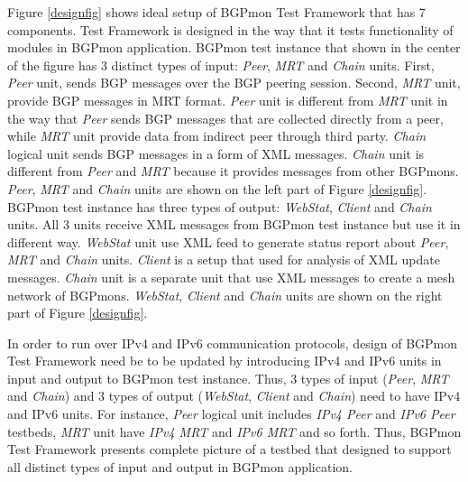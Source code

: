 Figure \ref{designfig} shows ideal setup of  BGPmon Test Framework that has 7 components.   Test Framework is designed in the way that it tests functionality of  modules in BGPmon application.  BGPmon test instance that shown in the center of the figure  has 3 distinct types of input: \emph{Peer}, \emph{MRT} and \emph{Chain} units.  First, \emph{Peer} unit, sends BGP messages over the BGP peering session.   Second, \emph{MRT} unit, provide BGP messages in MRT format.  \emph{Peer} unit is different from \emph{MRT} unit in the way that \emph{Peer} sends BGP messages that are collected directly from a peer, while \emph{MRT} unit provide data from indirect peer through third party. \emph{Chain} logical unit sends BGP messages in a form of XML messages. \emph{Chain} unit is different from \emph{Peer} and \emph{MRT} because it provides messages from other BGPmons. \emph{Peer}, \emph{MRT} and \emph{Chain} units are shown on the left part of Figure \ref{designfig}.   
BGPmon test instance has three types of output: \emph{WebStat}, \emph{Client} and \emph{Chain} units. All 3 units receive XML messages from BGPmon test instance but use it in different way. \emph{WebStat} unit use XML feed to  generate status report about \emph{Peer}, \emph{MRT} and \emph{Chain} units. \emph{Client} is a setup that used for analysis of XML update messages. \emph{Chain} unit is a separate unit that use XML messages to create a mesh network of BGPmons. \emph{WebStat}, \emph{Client} and \emph{Chain} units are shown on the right part of  Figure \ref{designfig}. 

In order to run over IPv4 and IPv6 communication protocols, design of BGPmon Test Framework need be to be updated by introducing IPv4 and IPv6 units in input and output to BGPmon test instance. Thus, 3 types of input (\emph{Peer}, \emph{MRT} and  \emph{Chain}) and 3 types of output (\emph{WebStat}, \emph{Client} and \emph{Chain})  need to have IPv4 and IPv6 units.  For instance, \emph{Peer} logical unit includes \emph{IPv4 Peer} and \emph{IPv6 Peer} testbeds, \emph{MRT} unit have \emph{IPv4 MRT} and \emph{IPv6 MRT} and so forth.  Thus, BGPmon Test Framework presents complete picture of a testbed that designed to support all distinct types of input and output in BGPmon application.


